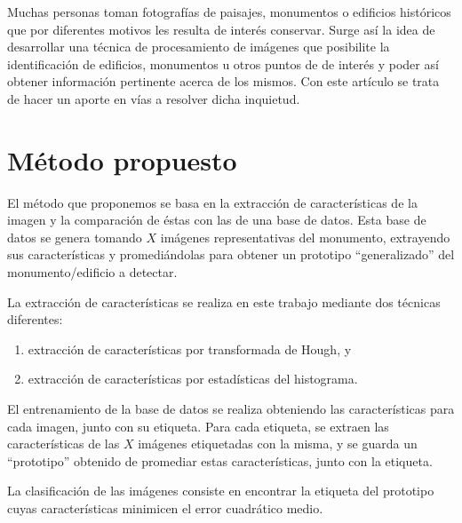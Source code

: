 \documentclass[conference,spanish,a4paper,10pt,oneside,final]{tfmpd}
\begin{document}

Muchas personas toman fotografías de paisajes, monumentos o edificios históricos
que por diferentes motivos les resulta de interés conservar.
Surge así la idea de desarrollar una técnica de procesamiento de imágenes
que posibilite la identificación de edificios, monumentos u otros puntos de
de interés y poder así obtener información pertinente
acerca de los mismos. Con este artículo se trata
de hacer un aporte en vías a resolver dicha inquietud.
%
%
%
%
\section{Método propuesto}
El método que proponemos se basa en la extracción de características de la
imagen y la comparación de éstas con las de una base de datos.
Esta base de datos se genera tomando $X$ imágenes representativas del monumento,
extrayendo sus características y promediándolas para obtener un prototipo
``generalizado'' del monumento/edificio a detectar.

La extracción de características se realiza en este trabajo mediante dos
técnicas diferentes:
\begin{enumerate}
\item extracción de características por transformada de Hough, y
\item extracción de características por estadísticas del histograma.
\end{enumerate}

El entrenamiento de la base de datos se realiza obteniendo las características
para cada imagen, junto con su etiqueta. Para cada etiqueta, se extraen las
características de las $X$ imágenes etiquetadas con la misma, y se guarda un
``prototipo'' obtenido de promediar estas características, junto con la
etiqueta.

La clasificación de las imágenes consiste en encontrar la etiqueta del
prototipo cuyas características minimicen el error cuadrático medio.

%
%
\end{document}
